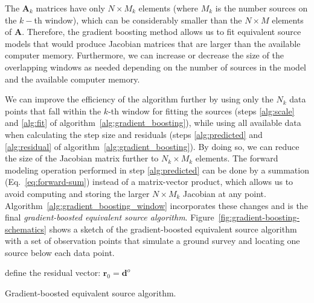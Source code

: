 The $\mathbf{A}_k$ matrices have only $N \times M_k$ elements
(where $M_k$ is the number sources on the $k-$th window), which can be
considerably smaller than the $N \times M$ elements of $\mathbf{A}$.
Therefore, the gradient boosting method allows us to fit
equivalent source models that would produce Jacobian matrices that are larger
than the available computer memory.
Furthermore, we can increase or decrease the size of the overlapping windows as
needed depending on the number of sources in the model and the available
computer memory.

We can improve the efficiency of the algorithm further by using only the $N_k$ data
points that fall within the $k$-th window for fitting the sources
(steps \ref{alg:scale} and \ref{alg:fit} of
algorithm~\ref{alg:gradient_boosting}),
while using all available data when calculating the step size and residuals
(steps \ref{alg:predicted} and \ref{alg:residual}
of algorithm~\ref{alg:gradient_boosting}).
By doing so, we can reduce the size of the Jacobian matrix further to $N_k
\times M_k$ elements.
The forward modeling operation performed in step \ref{alg:predicted} can be
done by a summation (Eq.~\ref{eq:forward-sum})
instead of a matrix-vector product, which allows us to avoid computing and
storing the larger $N \times M_k$ Jacobian at any point.
Algorithm~\ref{alg:gradient_boosting_window} incorporates these changes and is
the final \textit{gradient-boosted equivalent source algorithm}.
Figure~\ref{fig:gradient-boosting-schematics} shows a sketch of the
gradient-boosted equivalent source algorithm with a set of observation points
that simulate a ground survey and locating one source below each data point.

\begin{algorithm}[!h]
  \DontPrintSemicolon
  define the residual vector: $\mathbf{r}_{0} = \mathbf{d}^o$ \;
  \BlankLine
  \caption{Gradient-boosted equivalent source algorithm.}
  \label{alg:gradient_boosting_window}
\end{algorithm}

